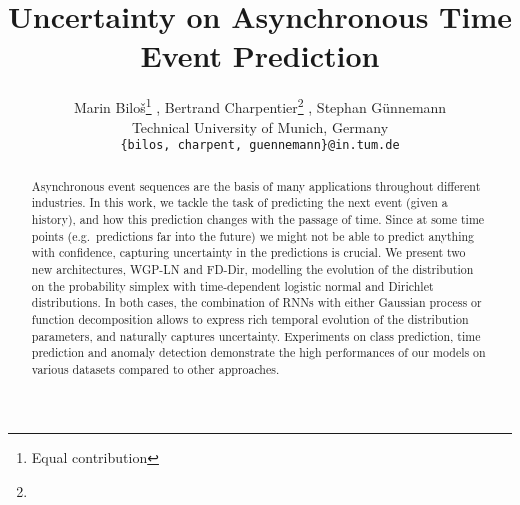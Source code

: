\documentclass{article}
\title{Uncertainty on Asynchronous Time Event Prediction}
\author{%
  Marin Biloš\thanks{Equal contribution} , Bertrand Charpentier\footnote[1]{} , Stephan Günnemann\\
  Technical University of Munich, Germany\\
  \texttt{\{bilos, charpent, guennemann\}@in.tum.de}
}
\newcommand\GPModel{WGP-LN\xspace}
\newcommand\DirModel{FD-Dir\xspace}
\begin{document}
\maketitle

\begin{abstract}
Asynchronous event sequences are the basis of many applications throughout different industries. In this work, we tackle the task of predicting the next event (given a history), and how this prediction changes with the passage of time. Since at some time points (e.g.\ predictions far into the future) we might not be able to predict anything with confidence, capturing uncertainty in the predictions  is crucial. We present two new architectures, \GPModel and \DirModel, modelling the evolution of the distribution on the probability simplex with time-dependent logistic normal and Dirichlet distributions. In both cases, the combination of RNNs with either Gaussian process or function decomposition allows to express rich temporal evolution of the distribution parameters, and naturally captures uncertainty. Experiments on class prediction, time prediction and anomaly detection demonstrate the high performances of our models on various datasets compared to other approaches.
\end{abstract}











\newpage
\appendix

\setcounter{equation}{0}
\renewcommand\theequation{\Alph{section}.\arabic{equation}}










\end{document}
